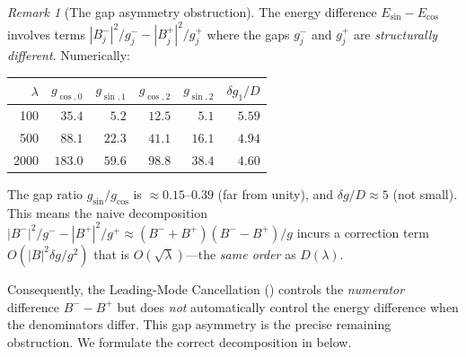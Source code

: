 \documentclass[12pt,a4paper]{article}
\theoremstyle{definition}
\theoremstyle{remark}
\newtheorem{remark}[theorem]{Remark}
\begin{document}
\begin{remark}[The gap asymmetry obstruction]
\label{rem:gap-asymmetry}
The energy difference $E_{\sin} - E_{\cos}$ involves terms $|B_j^-|^2/g_j^- - |B_j^+|^2/g_j^+$ where the gaps $g_j^-$ and $g_j^+$ are \emph{structurally different}. Numerically:

\begin{center}
\small
\renewcommand{\arraystretch}{1.15}
\begin{tabular}{r|rr|rr|r}
$\lambda$ & $g_{\cos,0}$ & $g_{\sin,1}$ & $g_{\cos,2}$ & $g_{\sin,2}$ & $\delta g_1/D$ \\\hline
100  & $35.4$ & $5.2$  & $12.5$ & $5.1$  & $5.59$ \\
500  & $88.1$ & $22.3$ & $41.1$ & $16.1$ & $4.94$ \\
2000 & $183.0$ & $59.6$ & $98.8$ & $38.4$ & $4.60$
\end{tabular}
\end{center}

\noindent The gap ratio $g_{\sin}/g_{\cos}$ is $\approx 0.15$--$0.39$ (far from unity), and $\delta g/D \approx 5$ (not small). This means the naive decomposition $|B^-|^2/g^- - |B^+|^2/g^+ \approx (B^- + B^+)(B^- - B^+)/g$ incurs a correction term $O(|B|^2 \delta g / g^2)$ that is $O(\sqrt{\lambda})$---the \emph{same order} as $D(\lambda)$.

Consequently, the Leading-Mode Cancellation () controls the \emph{numerator} difference $B^- - B^+$ but does \emph{not} automatically control the energy difference when the denominators differ. This gap asymmetry is the precise remaining obstruction. We formulate the correct decomposition in  below.
\end{remark}
\end{document}
